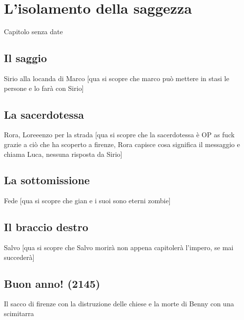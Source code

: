 
\chapter{L'isolamento della saggezza}
Capitolo senza date
\section{Il saggio}
Sirio alla locanda di Marco [qua si scopre che marco può mettere in stasi le persone e lo farà con Sirio]

\section{La sacerdotessa}
Rora, Loreeenzo per la strada [qua si scopre che la sacerdotessa è OP as fuck grazie a ciò che ha scoperto a firenze, Rora capisce cosa significa il messaggio e chiama Luca, nessuna risposta da Sirio]

\section{La sottomissione}
Fede [qua si scopre che gian e i suoi sono eterni zombie]

\section{Il braccio destro}
Salvo [qua si scopre che Salvo morirà non appena capitolerà l'impero, se mai succederà]

\section{Buon anno! (2145)}
Il sacco di firenze con la distruzione delle chiese e la morte di Benny con una scimitarra
